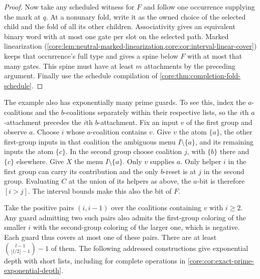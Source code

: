 \begin{proof}
Now take any scheduled witness for $F$ and follow one occurrence
supplying the mark at $q$. At a nonunary fold, write it as the owned
choice of the selected child and the fold of all its other children.
Associativity gives an equivalent binary word with at most one gate
per slot on the selected path. Marked linearization
(\cref{core:lem:neutral-marked-linearization,core:cor:interval-linear-cover})
keeps that occurrence's full type and gives a spine below $F$ with
at most that many gates. This spine must have at least $m$ attachments
by the preceding argument. Finally use the schedule compilation of
\cref{core:thm:completion-fold-schedule}.
\end{proof}

The example also has exponentially many prime guards. To see this,
index the $a$-coalitions and the $b$-coalitions separately within their
respective lists, so the $i$th $a$-attachment precedes the $i$th
$b$-attachment. Fix an input $v$ of the first group and observe $a$.
Choose $i$ whose $a$-coalition contains $v$. Give $v$ the atom $\{a\}$,
the other first-group inputs in that coalition the ambiguous menu
$I\setminus\{a\}$, and its remaining inputs the atom $\{c\}$. In the
second group choose coalition $j$, with $\{b\}$ there and $\{c\}$
elsewhere. Give $X$ the menu $I\setminus\{a\}$. Only $v$ supplies $a$.
Only helper $i$ in the first group can carry its contribution and the
only $b$-reset is at $j$ in the second group. Evaluating $C$ at the
union of its helpers as above, the $a$-bit is therefore $[i>j]$.
The interval bounds make this also the bit of $F$.

Take the positive pairs $(i,i-1)$ over the coalitions containing $v$
with $i\ge2$. Any guard admitting two such pairs also admits the
first-group coloring of the smaller $i$ with the second-group
coloring of the larger one, which is negative. Each guard thus
covers at most one of these pairs. There are at least
$\binom{l-1}{\lfloor l/2\rfloor-1}-1$ of them. The following
addressed constructions give exponential depth with short lists,
including for complete operations in
\cref{core:cor:exact-prime-exponential-depth}.

